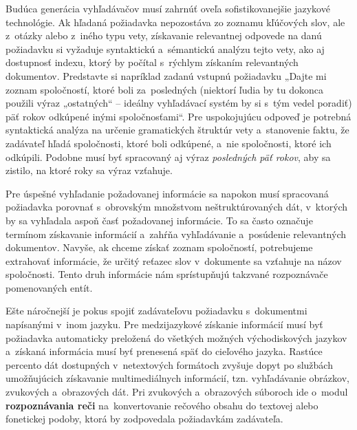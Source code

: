\begin{multicols}{2}
Budúca generácia vyhľadávačov musí zahrnúť oveľa sofistikovanejšie jazykové technológie. Ak hľadaná požiadavka nepozostáva zo zoznamu kľúčových slov, ale z~otázky alebo z~iného typu vety, získavanie relevantnej odpovede na danú požiadavku si vyžaduje syntaktickú a~sémantickú analýzu tejto vety, ako aj dostupnosť indexu, ktorý by počítal s~rýchlym získaním relevantných dokumentov. Predstavte si napríklad zadanú vstupnú požiadavku „Dajte mi zoznam spoločností, ktoré boli za~posledných (niektorí ľudia by tu dokonca použili výraz „ostatných“ – ideálny vyhľadávací systém by si s~tým vedel poradiť) päť rokov odkúpené inými spoločnosťami“. Pre uspokojujúcu odpoveď je potrebná syntaktická analýza na určenie gramatických štruktúr vety a~stanovenie faktu, že zadávateľ hľadá spoločnosti, ktoré boli odkúpené, a~nie spoločnosti, ktoré ich odkúpili. Podobne musí byť spracovaný aj výraz \emph{posledných päť rokov}, aby sa zistilo, na ktoré roky sa výraz vzťahuje. 


Pre úspešné vyhľadanie požadovanej informácie sa napokon musí spracovaná požiadavka porovnať s~obrovským množstvom neštruktúrovaných dát, v~ktorých by sa vyhľadala aspoň časť požadovanej informácie. To sa často označuje termínom získavanie informácií a~zahŕňa vyhľadávanie a~posúdenie relevantných dokumentov. Navyše, ak chceme získať zoznam spoločností, potrebujeme extrahovať informácie, že určitý reťazec slov v~dokumente sa vzťahuje na názov spoločnosti. Tento druh informácie nám sprístupňujú takzvané rozpoznávače pomenovaných entít.

Ešte náročnejší je pokus spojiť zadávateľovu požiadavku
s~dokumentmi napísanými v~inom jazyku. Pre medzijazykové
získanie informácií musí byť požiadavka automaticky preložená
do všetkých možných východiskových jazykov a~získaná informácia
musí byť prenesená späť do cieľového jazyka. Rastúce percento
dát dostupných v~netextových formátoch zvyšuje dopyt po službách
umožňujúcich získavanie multimediálnych informácií,
tzn. vyhľadávanie obrázkov, zvukových a~obrazových dát. Pri
zvukových a~obrazových súboroch ide o~modul \textbf{rozpoznávania
reči} na~konvertovanie rečového obsahu do textovej alebo fonetickej
podoby, ktorá by zodpovedala požiadavkám zadávateľa.


\end{multicols}
